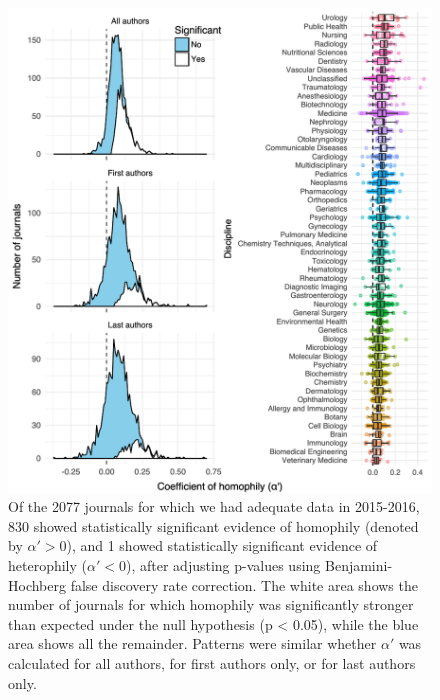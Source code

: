 \documentclass[12pt,]{article}
\begin{document}
\newpage

\begin{figure}
\centering
\includegraphics{../figures/figure2.pdf}
\caption{Of the 2077 journals for which we had adequate data in
2015-2016, 830 showed statistically significant evidence of homophily
(denoted by \(\alpha' > 0\)), and 1 showed statistically significant
evidence of heterophily (\(\alpha' < 0\)), after adjusting p-values
using Benjamini-Hochberg false discovery rate correction. The white area
shows the number of journals for which homophily was significantly
stronger than expected under the null hypothesis (p \textless{} 0.05),
while the blue area shows all the remainder. Patterns were similar
whether \(\alpha'\) was calculated for all authors, for first authors
only, or for last authors only. \label{alpha_histograms}}
\end{figure}

\newpage
\end{document}
